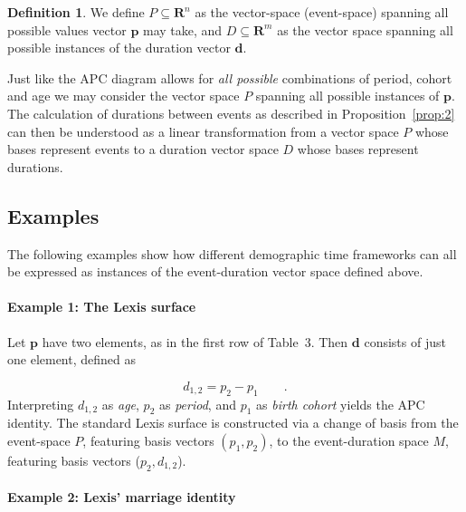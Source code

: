\documentclass{bmcart}
\theoremstyle{definition}
\newtheorem{definition}{Definition}[section]
\begin{document}
\begin{definition} 
  We define $P\subseteq\mathbf{R}^n$ as the vector-space (event-space) spanning all possible values vector $\boldsymbol{p}$ may take, and $D\subseteq\mathbf{R}^m$ as the vector space spanning all possible instances of the duration vector $\boldsymbol{d}$. 
  \label{def:1b}
\end{definition}

Just like the APC diagram allows for \emph{all possible} combinations of period,
cohort and age we may consider the vector space $P$ spanning all possible
instances of $\boldsymbol{p}$. The calculation of durations between events as
described in Proposition~\ref{prop:2} can then be understood as a linear
transformation from a vector space $P$ whose bases represent events to a
duration vector space $D$ whose bases represent durations.

\FloatBarrier
\subsection{Examples}
\label{sec:examples}
The following examples show how different demographic time frameworks can all be expressed as instances of the event-duration vector space defined above.

\paragraph{Example 1: The Lexis surface}

Let $\boldsymbol{p}$ have two elements, as in the first row of
Table~3. Then $\boldsymbol{d}$ consists of just one element, defined as

\begin{equation}
d_{1,2} = p_2 - p_1   \quad\quad.
\end{equation}
%
Interpreting $d_{1,2}$ as \emph{age}, $p_2$ as \emph{period}, and $p_1$ as
\emph{birth cohort} yields the APC identity. The standard Lexis surface is
constructed via a change of basis from the event-space $P$, featuring basis vectors $(p_1,
p_2)$, to the event-duration space $M$, featuring basis vectors ($p_2, d_{1,2}$).

\paragraph{Example 2: Lexis' marriage identity}
\end{document}
